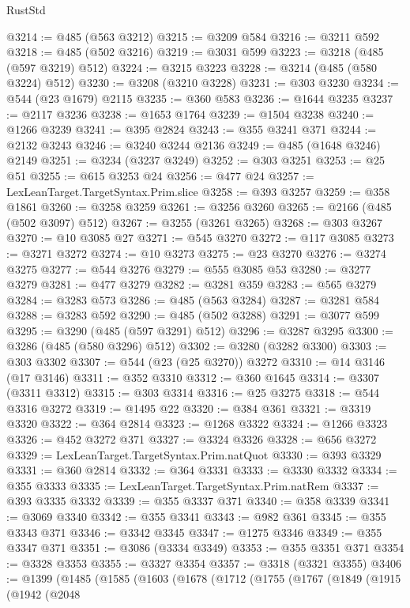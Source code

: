 \begin{lexlean}{RustStd}
\begin{coremodule}
@3214 := @485 (@563 @3212)
@3215 := @3209 @584
@3216 := @3211 @592
@3218 := @485 (@502 @3216)
@3219 := @3031 @599
@3223 := @3218 (@485 (@597 @3219) @512)
@3224 := @3215 @3223
@3228 := @3214 (@485 (@580 @3224) @512)
@3230 := @3208 (@3210 @3228)
@3231 := @303 @3230
@3234 := @544 (@23 @1679) @2115
@3235 := @360 @583
@3236 := @1644 @3235
@3237 := @2117 @3236
@3238 := @1653 @1764
@3239 := @1504 @3238
@3240 := @1266 @3239
@3241 := @395 @2824
@3243 := @355 @3241 @371
@3244 := @2132 @3243
@3246 := @3240 @3244 @2136
@3249 := @485 (@1648 @3246) @2149
@3251 := @3234 (@3237 @3249)
@3252 := @303 @3251
@3253 := @25 @51
@3255 := @615 @3253 @24
@3256 := @477 @24
@3257 := LexLeanTarget.TargetSyntax.Prim.slice
@3258 := @393 @3257
@3259 := @358 @1861
@3260 := @3258 @3259
@3261 := @3256 @3260
@3265 := @2166 (@485 (@502 @3097) @512)
@3267 := @3255 (@3261 @3265)
@3268 := @303 @3267
@3270 := @10 @3085 @27
@3271 := @545 @3270
@3272 := @117 @3085
@3273 := @3271 @3272
@3274 := @10 @3273
@3275 := @23 @3270
@3276 := @3274 @3275
@3277 := @544 @3276
@3279 := @555 @3085 @53
@3280 := @3277 @3279
@3281 := @477 @3279
@3282 := @3281 @359
@3283 := @565 @3279
@3284 := @3283 @573
@3286 := @485 (@563 @3284)
@3287 := @3281 @584
@3288 := @3283 @592
@3290 := @485 (@502 @3288)
@3291 := @3077 @599
@3295 := @3290 (@485 (@597 @3291) @512)
@3296 := @3287 @3295
@3300 := @3286 (@485 (@580 @3296) @512)
@3302 := @3280 (@3282 @3300)
@3303 := @303 @3302
@3307 := @544 (@23 (@25 @3270)) @3272
@3310 := @14 @3146 (@17 @3146)
@3311 := @352 @3310
@3312 := @360 @1645
@3314 := @3307 (@3311 @3312)
@3315 := @303 @3314
@3316 := @25 @3275
@3318 := @544 @3316 @3272
@3319 := @1495 @22
@3320 := @384 @361
@3321 := @3319 @3320
@3322 := @364 @2814
@3323 := @1268 @3322
@3324 := @1266 @3323
@3326 := @452 @3272 @371
@3327 := @3324 @3326
@3328 := @656 @3272
@3329 := LexLeanTarget.TargetSyntax.Prim.natQuot
@3330 := @393 @3329
@3331 := @360 @2814
@3332 := @364 @3331
@3333 := @3330 @3332
@3334 := @355 @3333
@3335 := LexLeanTarget.TargetSyntax.Prim.natRem
@3337 := @393 @3335 @3332
@3339 := @355 @3337 @371
@3340 := @358 @3339
@3341 := @3069 @3340
@3342 := @355 @3341
@3343 := @982 @361
@3345 := @355 @3343 @371
@3346 := @3342 @3345
@3347 := @1275 @3346
@3349 := @355 @3347 @371
@3351 := @3086 (@3334 @3349)
@3353 := @355 @3351 @371
@3354 := @3328 @3353
@3355 := @3327 @3354
@3357 := @3318 (@3321 @3355)
@3406 := @1399
    (@1485
      (@1585
        (@1603
          (@1678
            (@1712
              (@1755
                (@1767
                  (@1849
                    (@1915
                      (@1942
                        (@2048

\end{coremodule}
\end{lexlean}
